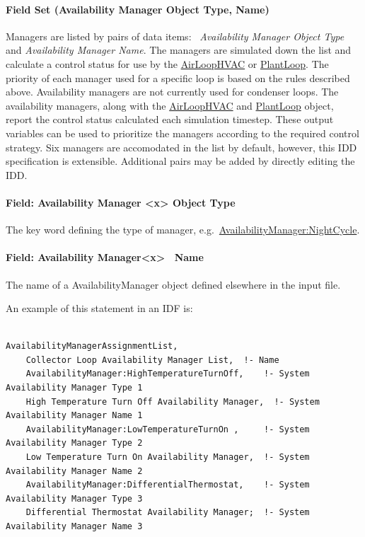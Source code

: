 \paragraph{Field Set (Availability Manager Object Type, Name)}\label{field-set-availability-manager-object-type-name}

Managers are listed by pairs of data items:~ \emph{Availability Manager Object Type} and \emph{Availability Manager Name}. The managers are simulated down the list and calculate a control status for use by the \hyperref[airloophvac]{AirLoopHVAC} or \hyperref[plantloop]{PlantLoop}. The priority of each manager used for a specific loop is based on the rules described above. Availability managers are not currently used for condenser loops. The availability managers, along with the \hyperref[airloophvac]{AirLoopHVAC} and \hyperref[plantloop]{PlantLoop} object, report the control status calculated each simulation timestep. These output variables can be used to prioritize the managers according to the required control strategy. Six managers are accomodated in the list by default, however, this IDD specification is extensible. Additional pairs may be added by directly editing the IDD.

\paragraph{Field: Availability Manager \textless{}x\textgreater{} Object Type}\label{field-availability-manager-x-object-type}

The key word defining the type of manager, e.g.~\hyperref[availabilitymanagernightcycle]{AvailabilityManager:NightCycle}.

\paragraph{Field: Availability Manager\textless{}x\textgreater{}~ Name}\label{field-availability-managerx-name}

The name of a AvailabilityManager object defined elsewhere in the input file.

An example of this statement in an IDF is:

\begin{lstlisting}

AvailabilityManagerAssignmentList,
    Collector Loop Availability Manager List,  !- Name
    AvailabilityManager:HighTemperatureTurnOff,    !- System Availability Manager Type 1
    High Temperature Turn Off Availability Manager,  !- System Availability Manager Name 1
    AvailabilityManager:LowTemperatureTurnOn ,     !- System Availability Manager Type 2
    Low Temperature Turn On Availability Manager,  !- System Availability Manager Name 2
    AvailabilityManager:DifferentialThermostat,    !- System Availability Manager Type 3
    Differential Thermostat Availability Manager;  !- System Availability Manager Name 3
\end{lstlisting}

